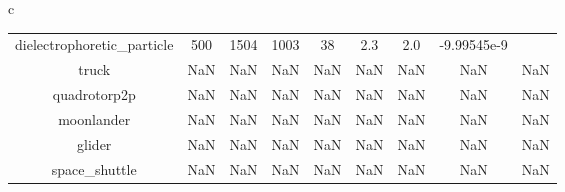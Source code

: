 \documentclass{standalone}
\begin{document}
\begin{tabular}{c}
\begin{tabular}{ccccccccc}
  dielectrophoretic\_particle & 500 & 1504 & 1003 & 38 & 2.3 & 2.0 & -9.99545e-9 & \color{red}{Infeasible Problem} \\
  truck & NaN & NaN & NaN & NaN & NaN & NaN & NaN & NaN \\
  quadrotorp2p & NaN & NaN & NaN & NaN & NaN & NaN & NaN & NaN \\
  moonlander & NaN & NaN & NaN & NaN & NaN & NaN & NaN & NaN \\
  glider & NaN & NaN & NaN & NaN & NaN & NaN & NaN & NaN \\
  space\_shuttle & NaN & NaN & NaN & NaN & NaN & NaN & NaN & NaN \\\hline
\end{tabular}
\end{tabular}
\end{document}

